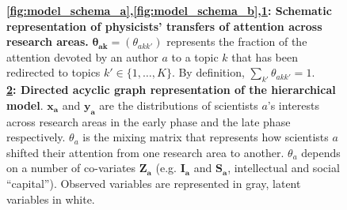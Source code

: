 \documentclass{article}
\begin{document}
\begin{figure}[h]
\begin{subfigure}[b]{0.25\textwidth}
{
          }  
          \caption{\label{fig:model_schema_c}}
     \end{subfigure}\hfill%
\begin{subfigure}[b]{0.22\textwidth}
    \centering
    \caption{\label{fig:model_structure}}
\end{subfigure}

     \caption{\textbf{\ref{fig:model_schema_a},\ref{fig:model_schema_b},\ref{fig:model_schema_c}: Schematic representation of physicists' transfers of attention across research areas.} $\bm{\theta_{ak}}=(\theta_{akk'})$ represents the fraction of the attention devoted by an author $a$ to a topic $k$ that has been redirected to topics $k' \in \{1,\dots,K\}$. By definition, $\sum_{k'} \theta_{akk'}=1$. %
     \\
     \textbf{\ref{fig:model_structure}: Directed acyclic graph representation of the hierarchical model}. $\bm{x_a}$ and $\bm{y_a}$ are the distributions of scientists $a$'s interests across research areas in the early phase and the late phase respectively. $\theta_a$ is the mixing matrix that represents how scientists $a$ shifted their attention from one research area to another. $\theta_a$ depends on a number of co-variates $\bm{Z_a}$ (e.g. $\bm{I_a}$ and $\bm{S_a}$, intellectual and social ``capital''). Observed variables are represented in gray, latent variables in white.}
     \label{fig:ei}
 \end{figure}
\end{document}
